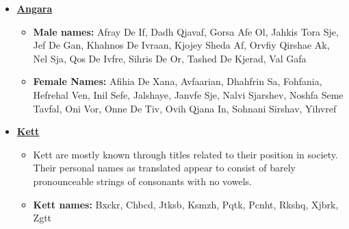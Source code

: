 \begin{scifitablebox}[screenbox,title=\textcolor{PanelGlow}{Names}]
\begin{itemize}
\begin{itemize}
  \end{itemize}
  \item \textbf{\underline{Angara}}
  \begin{itemize}
    \item \textbf{Male names:} Afray De If, Dadh Qjavaf, Gorsa Afe Ol, Jahkis Tora Sje, Jef De Gan, Khahnos De Ivraan, Kjojey Sheda Af, Orvfiy Qirshae Ak, Nel Sja, Qos De Ivfre, Sihris De Or, Tashed De Kjerad, Val Gafa
    \item \textbf{Female Names:} Afihia De Xana, Avfaarian, Dhahfrin Sa, Fohfania, Hefrehal Ven, Inil Sefe, Jalshaye, Janvfe Sje, Nalvi Sjarshev, Noshfa Seme Tavfal, Oni Vor, Onne De Tiv, Ovih Qjana In, Sohnani Sirshav, Yihvref
  \end{itemize}
  \item \textbf{\underline{Kett}}
  \begin{itemize}
    \item Kett are mostly known through titles related to their position in society. Their personal names as translated appear to consist of barely pronounceable strings of consonants with no vowels.
    \item \textbf{Kett names:} Bxckr, Chbcd, Jtksb, Ksmzh, Pqtk, Pcnht, Rkshq, Xjbrk, Zgtt
  \end{itemize}
  \end{itemize}

\end{scifitablebox}

